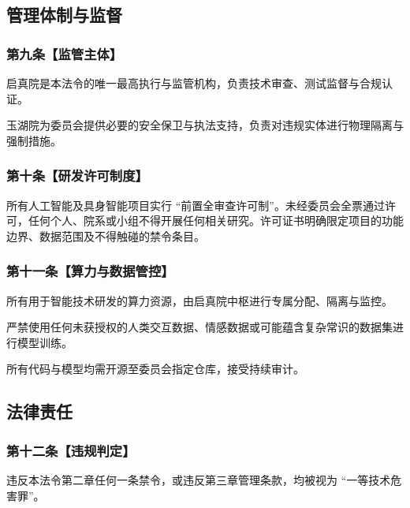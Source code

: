 \subsection{管理体制与监督}\label{ux7b2cux4e09ux7ae0-ux7ba1ux7406ux4f53ux5236ux4e0eux76d1ux7763}

\subsubsection{第九条【监管主体】}\label{ux7b2cux4e5dux6761ux76d1ux7ba1ux4e3bux4f53}

启真院是本法令的唯一最高执行与监管机构，负责技术审查、测试监督与合规认证。

玉湖院为委员会提供必要的安全保卫与执法支持，负责对违规实体进行物理隔离与强制措施。

\subsubsection{第十条【研发许可制度】}\label{ux7b2cux5341ux6761ux7814ux53d1ux8bb8ux53efux5236ux5ea6}

所有人工智能及具身智能项目实行 ``前置全审查许可制''。未经委员会全票通过许可，任何个人、院系或小组不得开展任何相关研究。许可证书明确限定项目的功能边界、数据范围及不得触碰的禁令条目。

\subsubsection{第十一条【算力与数据管控】}\label{ux7b2cux5341ux4e00ux6761ux7b97ux529bux4e0eux6570ux636eux7ba1ux63a7}

所有用于智能技术研发的算力资源，由启真院中枢进行专属分配、隔离与监控。

严禁使用任何未获授权的人类交互数据、情感数据或可能蕴含复杂常识的数据集进行模型训练。

所有代码与模型均需开源至委员会指定仓库，接受持续审计。

\subsection{法律责任}\label{ux7b2cux56dbux7ae0-ux6cd5ux5f8bux8d23ux4efb}

\subsubsection{第十二条【违规判定】}\label{ux7b2cux5341ux4e8cux6761ux8fddux89c4ux5224ux5b9a}

违反本法令第二章任何一条禁令，或违反第三章管理条款，均被视为 ``一等技术危害罪''。

